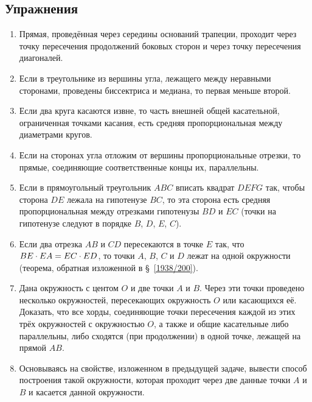 {\small

\subsection*{Упражнения}

\begin{center}
\end{center}

\begin{enumerate}[noitemsep]

\item
Прямая, проведённая через середины оснований трапеции, проходит через точку пересечения продолжений боковых сторон и через точку пересечения диагоналей.

\item
Если в треугольнике из вершины угла, лежащего между неравными сторонами, проведены биссектриса и медиана, то первая меньше второй.

\item
Если два круга касаются извне, то часть внешней общей касательной, ограниченная точками касания, есть средняя пропорциональная между диаметрами кругов.

\item
Если на сторонах угла отложим от вершины пропорциональные отрезки, то прямые, соединяющие соответственные концы их, параллельны.

\item
Если в прямоугольный треугольник $ABC$ вписать квадрат $DEFG$ так, чтобы сторона $DE$ лежала на гипотенузе $BC$, то эта сторона есть средняя пропорциональная между отрезками гипотенузы $BD$ и $EC$ (точки на гипотенузе следуют в порядке $B$, $D$, $E$, $C$).

\item
Если два отрезка $AB$ и $CD$ пересекаются в точке $E$ так, что $BE\cdot  EA\z=EC\cdot  ED$, то точки $A$, $B$, $C$ и $D$ лежат на одной окружности (теорема, обратная изложенной в §~\ref{1938/200}).

\item
Дана окружность с центом $O$ и две точки $A$ и $B$.
Через эти точки проведено несколько окружностей, пересекающих окружность $O$ или касающихся её.
Доказать, что все хорды, соединяющие точки пересечения каждой из этих трёх окружностей с окружностью $O$, а также и общие касательные либо параллельны, либо сходятся (при продолжении) в одной точке, лежащей на прямой $AB$. 

\item
Основываясь на свойстве, изложенном в предыдущей задаче, вывести способ построения такой окружности, которая проходит через две данные точки $A$ и $B$ и касается данной окружности.


\end{enumerate}}
